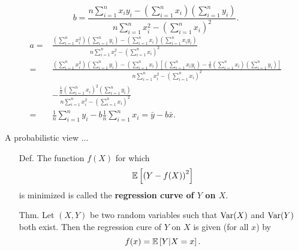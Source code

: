 \begin{frame}[fragile]
	\[
	b =
\frac{n\sum_{i=1}^n x_iy_i - \left(\sum_{i=1}^n x_i\right)\left(\sum_{i=1}^n y_i\right)}{n\sum_{i=1}^n x_i^2-\left(\sum_{i=1}^n x_i\right)^2}.
	\]
	\vfill
	\begin{align*}
		a=&
			 \frac{\left(\sum_{i=1}^n x_i^2\right)\left( \sum_{i=1}^n y_i\right) - \left(\sum_{i=1}^n x_i\right)\left(\sum_{i=1}^n x_iy_i\right)}{n\sum_{i=1}^n x_i^2-\left(\sum_{i=1}^n x_i\right)^2} \\[2em]
			 =&		 \frac{\left(\sum_{i=1}^n x_i^2\right)\left( \sum_{i=1}^n y_i\right) - \left(\sum_{i=1}^n x_i\right)\left[\left(\sum_{i=1}^n x_iy_i\right)-\frac 1n \left(\sum_{i=1}^n x_i\right)\left(\sum_{i=1}^n y_i\right)\right]}{n\sum_{i=1}^n x_i^2-\left(\sum_{i=1}^n x_i\right)^2} \\[2em]
			 &-  \frac{\frac 1n \left(\sum_{i=1}^n x_i\right)^2\left(\sum_{i=1}^n y_i\right)}{n\sum_{i=1}^n x_i^2-\left(\sum_{i=1}^n x_i\right)^2}\\[2em]
			 =&
			 \frac 1n \sum_{i=1}^n y_i - b\frac{1}{n} \sum_{i=1}^nx_i
			 = \bar{y} -b \bar{x}.
	\end{align*}
	\myEnd
\end{frame}
\begin{frame}[fragile]{A probabilistic view ... }
\begin{enumerate}
\item[Def.] The function $f(X)$ for which
\[
\mathbb{E}\left[  \left(Y-f(X)\right)^2\right]
\]
is minimized is called the \textcolor{yellow!80!black}{\bf regression curve of $Y$ on $X$}.
\vfill
\item[Thm.] Let $(X,Y)$ be two random variables such that $\text{Var}(X)$ and $\text{Var}(Y)$ both exist.
Then the regression cure of $Y$ on $X$ is given (for all $x$) by
\[
f(x) = \mathbb{E} \left[Y|X=x \right].
\]
\end{enumerate}
\end{frame}
